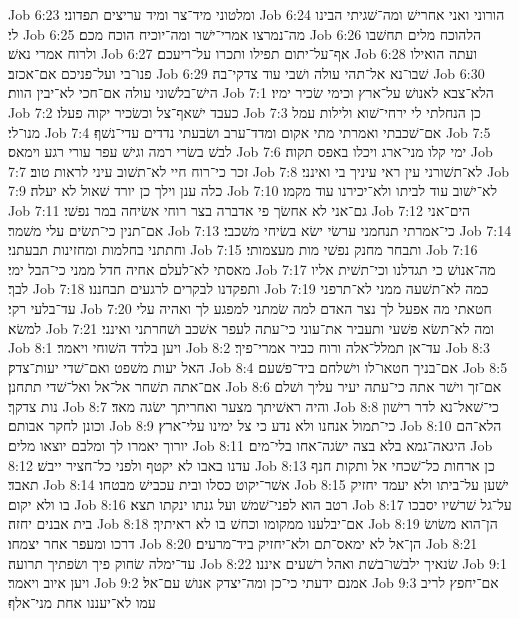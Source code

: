 Job 6:23  ומלטוני מיד־צר ומיד עריצים תפדוני׃
Job 6:24  הורוני ואני אחרישׁ ומה־שׁגיתי הבינו לי׃
Job 6:25  מה־נמרצו אמרי־ישׁר ומה־יוכיח הוכח מכם׃
Job 6:26  הלהוכח מלים תחשׁבו ולרוח אמרי נאשׁ׃
Job 6:27  אף־על־יתום תפילו ותכרו על־ריעכם׃
Job 6:28  ועתה הואילו פנו־בי ועל־פניכם אם־אכזב׃
Job 6:29  שׁבו־נא אל־תהי עולה ושׁבי עוד צדקי־בה׃
Job 6:30  הישׁ־בלשׁוני עולה אם־חכי לא־יבין הוות׃
Job 7:1  הלא־צבא לאנושׁ על־ארץ וכימי שׂכיר ימיו׃
Job 7:2  כעבד ישׁאף־צל וכשׂכיר יקוה פעלו׃
Job 7:3  כן הנחלתי לי ירחי־שׁוא ולילות עמל מנו־לי׃
Job 7:4  אם־שׁכבתי ואמרתי מתי אקום ומדד־ערב ושׂבעתי נדדים עדי־נשׁף׃
Job 7:5  לבשׁ בשׂרי רמה וגישׁ עפר עורי רגע וימאס׃
Job 7:6  ימי קלו מני־ארג ויכלו באפס תקוה׃
Job 7:7  זכר כי־רוח חיי לא־תשׁוב עיני לראות טוב׃
Job 7:8  לא־תשׁורני עין ראי עיניך בי ואינני׃
Job 7:9  כלה ענן וילך כן יורד שׁאול לא יעלה׃
Job 7:10  לא־ישׁוב עוד לביתו ולא־יכירנו עוד מקמו׃
Job 7:11  גם־אני לא אחשׂך פי אדברה בצר רוחי אשׂיחה במר נפשׁי׃
Job 7:12  הים־אני אם־תנין כי־תשׂים עלי משׁמר׃
Job 7:13  כי־אמרתי תנחמני ערשׂי ישׂא בשׂיחי משׁכבי׃
Job 7:14  וחתתני בחלמות ומחזינות תבעתני׃
Job 7:15  ותבחר מחנק נפשׁי מות מעצמותי׃
Job 7:16  מאסתי לא־לעלם אחיה חדל ממני כי־הבל ימי׃
Job 7:17  מה־אנושׁ כי תגדלנו וכי־תשׁית אליו לבך׃
Job 7:18  ותפקדנו לבקרים לרגעים תבחננו׃
Job 7:19  כמה לא־תשׁעה ממני לא־תרפני עד־בלעי רקי׃
Job 7:20  חטאתי מה אפעל לך נצר האדם למה שׂמתני למפגע לך ואהיה עלי למשׂא׃
Job 7:21  ומה לא־תשׂא פשׁעי ותעביר את־עוני כי־עתה לעפר אשׁכב ושׁחרתני ואינני׃
Job 8:1  ויען בלדד השׁוחי ויאמר׃
Job 8:2  עד־אן תמלל־אלה ורוח כביר אמרי־פיך׃
Job 8:3  האל יעות משׁפט ואם־שׁדי יעות־צדק׃
Job 8:4  אם־בניך חטאו־לו וישׁלחם ביד־פשׁעם׃
Job 8:5  אם־אתה תשׁחר אל־אל ואל־שׁדי תתחנן׃
Job 8:6  אם־זך וישׁר אתה כי־עתה יעיר עליך ושׁלם נות צדקך׃
Job 8:7  והיה ראשׁיתך מצער ואחריתך ישׂגה מאד׃
Job 8:8  כי־שׁאל־נא לדר רישׁון וכונן לחקר אבותם׃
Job 8:9  כי־תמול אנחנו ולא נדע כי צל ימינו עלי־ארץ׃
Job 8:10  הלא־הם יורוך יאמרו לך ומלבם יוצאו מלים׃
Job 8:11  היגאה־גמא בלא בצה ישׂגה־אחו בלי־מים׃
Job 8:12  עדנו באבו לא יקטף ולפני כל־חציר ייבשׁ׃
Job 8:13  כן ארחות כל־שׁכחי אל ותקות חנף תאבד׃
Job 8:14  אשׁר־יקוט כסלו ובית עכבישׁ מבטחו׃
Job 8:15  ישׁען על־ביתו ולא יעמד יחזיק בו ולא יקום׃
Job 8:16  רטב הוא לפני־שׁמשׁ ועל גנתו ינקתו תצא׃
Job 8:17  על־גל שׁרשׁיו יסבכו בית אבנים יחזה׃
Job 8:18  אם־יבלענו ממקומו וכחשׁ בו לא ראיתיך׃
Job 8:19  הן־הוא משׂושׂ דרכו ומעפר אחר יצמחו׃
Job 8:20  הן־אל לא ימאס־תם ולא־יחזיק ביד־מרעים׃
Job 8:21  עד־ימלה שׂחוק פיך ושׂפתיך תרועה׃
Job 8:22  שׂנאיך ילבשׁו־בשׁת ואהל רשׁעים איננו׃
Job 9:1  ויען איוב ויאמר׃
Job 9:2  אמנם ידעתי כי־כן ומה־יצדק אנושׁ עם־אל׃
Job 9:3  אם־יחפץ לריב עמו לא־יעננו אחת מני־אלף׃
